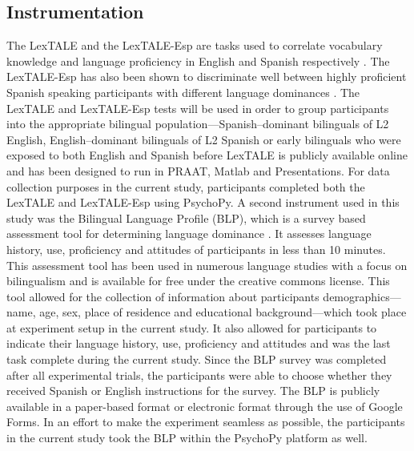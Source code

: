 \subsection{Instrumentation}
The LexTALE and the LexTALE-Esp are tasks used to correlate vocabulary knowledge and language proficiency in English and Spanish respectively \citep{Izura2014-yw,Lemhofer2012-hz}. The LexTALE-Esp has also been shown to discriminate well between highly proficient Spanish speaking participants with different language dominances \citep{Ferre2017-jq}. The LexTALE and LexTALE-Esp tests will be used in order to group participants into the appropriate bilingual population—Spanish–dominant bilinguals of L2 English, English–dominant bilinguals of L2 Spanish or early bilinguals who were exposed to both English and Spanish before %
LexTALE is publicly available online and has been designed to run in PRAAT, Matlab and Presentations. For data collection purposes in the current study, participants completed both the LexTALE and LexTALE-Esp using PsychoPy. 
A second instrument used in this study was the Bilingual Language Profile (BLP), which is a survey based assessment tool for determining language dominance \citep{Birdsong2012-wd}. It assesses language history, use, proficiency and attitudes of participants in less than 10 minutes. This assessment tool has been used in numerous language studies with a focus on bilingualism and is available for free under the creative commons license. This tool allowed for the collection of information about participants demographics---name, age, sex, place of residence and educational background---which took place at experiment setup in the current study. It also allowed for participants to indicate their language history, use, proficiency and attitudes and was the last task complete during the current study. Since the BLP survey was completed after all experimental trials, the participants were able to choose whether they received Spanish or English instructions for the survey. The BLP is publicly available in a paper-based format or electronic format through the use of Google Forms. In an effort to make the experiment seamless as possible, the participants in the current study took the BLP within the PsychoPy platform as well. 




